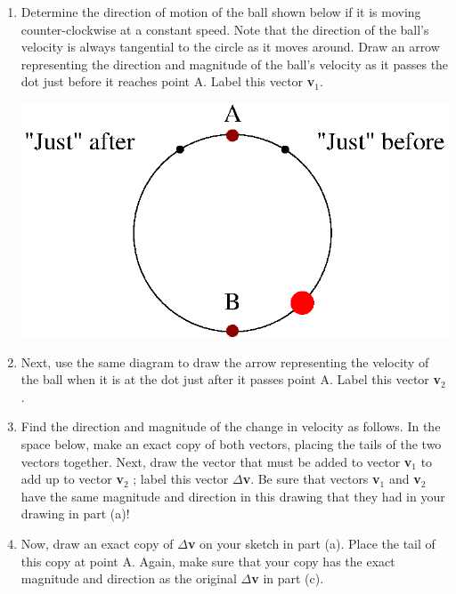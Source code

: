 \begin{enumerate}

\item Determine the direction of motion of the ball shown below if it is moving
counter-clockwise at a constant speed. Note that the direction of the ball's
velocity is always tangential to the circle as it moves around. Draw an arrow
representing the direction and magnitude of the ball's velocity as it passes
the dot just before it reaches point A. Label this vector \textbf{v}\( _{1} \). 

\vspace{0.3cm}
{\par\centering \includegraphics{iqsCentripetalForce/circ_motion_fig2b.eps} \par}
\vspace{0.3cm}

\item Next, use the same diagram to draw the arrow representing the velocity of
the ball when it is at the dot just after it passes point A. Label this vector
\textbf{v}\( _{2} \).

\item Find the direction and magnitude of the change in velocity as follows. In
the space below, make an exact copy of both vectors, placing the tails of the
two vectors together. Next, draw the vector that must be added to vector \textbf{v}\( _{1} \)
to add up to vector \textbf{v}\( _{2} \) ; label this vector \( \Delta  \)\textbf{v}.
Be sure that vectors \textbf{v}\( _{1} \) and \textbf{v}\( _{2} \) have the
same magnitude and direction in this drawing that they had in your drawing in
part (a)!
\vspace{30mm}

\item Now, draw an exact copy of \( \Delta  \)\textbf{v} on your sketch in part
(a). Place the tail of this copy at point A. Again, make sure that your copy
has the exact magnitude and direction as the original \( \Delta  \)\textbf{v}
in part (c).
\vspace{30mm}


\end{enumerate}
